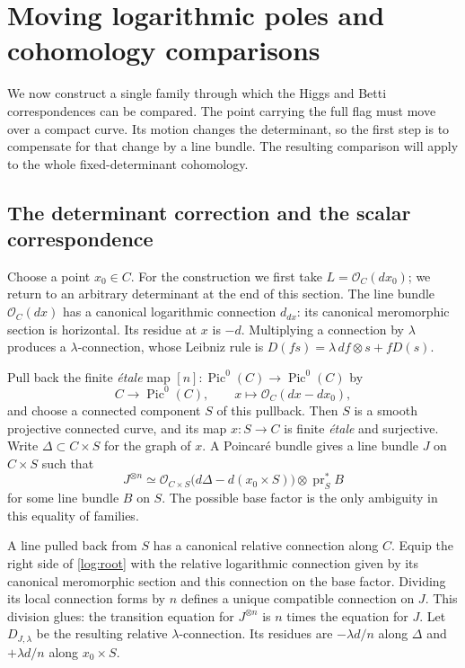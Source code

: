 \section{Moving logarithmic poles and cohomology comparisons}
\label{sec:logarithmic}

We now construct a single family through which the Higgs and Betti
correspondences can be compared.  The point carrying the full flag must move
over a compact curve.  Its motion changes the determinant, so the first step
is to compensate for that change by a line bundle.  The resulting comparison
will apply to the whole fixed-determinant cohomology.

\subsection{The determinant correction and the scalar correspondence}

Choose a point $x_0\in C$.  For the construction we first take
$L=\mathcal O_C(d x_0)$; we return to an arbitrary determinant at the end of
this section.  The line bundle $\mathcal O_C(d x)$ has a canonical
logarithmic connection $d_{d x}$: its canonical meromorphic section is
horizontal.  Its residue at $x$ is $-d$.  Multiplying a connection by
$\lambda$ produces a $\lambda$-connection, whose Leibniz rule is
$D(fs)=\lambda\,df\otimes s+fD(s)$.

Pull back the finite \emph{\'etale} map
$[n]:\operatorname{Pic}^0(C)\to\operatorname{Pic}^0(C)$ by
\[
 C\longrightarrow\operatorname{Pic}^0(C),\qquad
 x\longmapsto\mathcal O_C(d x-d x_0),
\]
and choose a connected component $S$ of this pullback.  Then $S$ is a smooth
projective connected curve, and its map $x:S\to C$ is finite \emph{\'etale}
and surjective.  Write $\Delta\subset C\times S$ for the graph of $x$.
A Poincar\'e bundle gives a line bundle $J$ on $C\times S$ such that
\begin{equation}
 J^{\otimes n}\simeq
 \mathcal O_{C\times S}\bigl(d\Delta-d(x_0\times S)\bigr)
       \otimes\operatorname{pr}_S^*B
 \label{log:root}
\end{equation}
for some line bundle $B$ on $S$.  The possible base factor is the only
ambiguity in this equality of families.

A line pulled back from $S$ has a canonical relative connection along $C$.
Equip the right side of \eqref{log:root} with the relative logarithmic
connection given by its canonical meromorphic section and this connection
on the base factor.  Dividing its local connection forms by $n$ defines
a unique compatible connection on $J$.  This division glues: the
transition equation for $J^{\otimes n}$ is $n$ times the equation for $J$.
Let $D_{J,\lambda}$ be the resulting relative $\lambda$-connection.  Its
residues are $-\lambda d/n$ along $\Delta$ and $+\lambda d/n$ along
$x_0\times S$.

